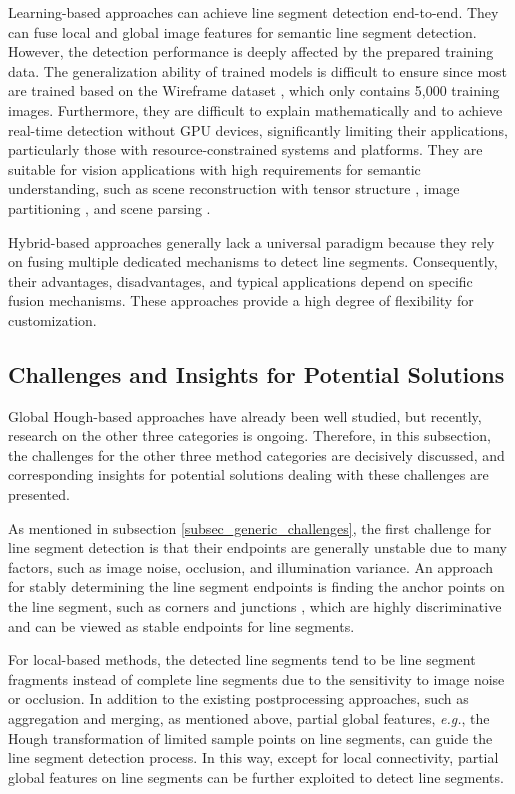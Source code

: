 \documentclass[journal,compsoc]{IEEEtran}
\begin{document}
Learning-based approaches can achieve line segment detection end-to-end. They can fuse local and global image features for semantic line segment detection. However, the detection performance is deeply affected by the prepared training data. The generalization ability of trained models is difficult to ensure since most are trained based on the Wireframe dataset \cite{LearningtoParseWireframesinImagesofMan-MadeEnvironments}, which only contains 5,000 training images. Furthermore, they are difficult to explain mathematically and to achieve real-time detection without GPU devices, significantly limiting their applications, particularly those with resource-constrained systems and platforms. They are suitable for vision applications with high requirements for semantic understanding, such as scene reconstruction \cite{hartley1997lines} with tensor structure \cite{liu2022tensor,liu2021tensor}, image partitioning \cite{7298931}, and scene parsing \cite{6619245}.

Hybrid-based approaches generally lack a universal paradigm because they rely on fusing multiple dedicated mechanisms to detect line segments. Consequently, their advantages, disadvantages, and typical applications depend on specific fusion mechanisms. These approaches provide a high degree of flexibility for customization.


\subsection{Challenges and Insights for Potential Solutions}
\label{subsec_detection_challenges}
Global Hough-based approaches have already been well studied, but recently, research on the other three categories is ongoing. Therefore, in this subsection, the challenges for the other three method categories are decisively discussed, and corresponding insights for potential solutions dealing with these challenges are presented.

As mentioned in subsection \ref{subsec_generic_challenges}, the first challenge for line segment detection is that their endpoints are generally unstable due to many factors, such as image noise, occlusion, and illumination variance. An approach for stably determining the line segment endpoints is finding the anchor points on the line segment, such as corners \cite{SODC, ACRA} and junctions \cite{End-to-EndWireframeParsing}, which are highly discriminative and can be viewed as stable endpoints for line segments.

For local-based methods, the detected line segments tend to be line segment fragments instead of complete line segments due to the sensitivity to image noise or occlusion. In addition to the existing postprocessing approaches, such as aggregation and merging, as mentioned above, partial global features, \textit{e.g.}, the Hough transformation of limited sample points on line segments, can guide the line segment detection process. In this way, except for local connectivity, partial global features on line segments can be further exploited to detect line segments.
\end{document}
